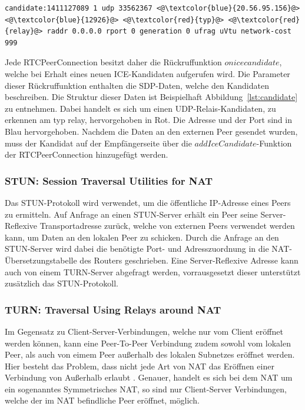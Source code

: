 \vspace{1pc}
\lstset{style=STYLE_ICE_CANDIDATE_0}
\begin{lstlisting}[caption={SDP-Datenstring eines Relais-ICE-Kandidaten},captionpos=b,label={lst:candidate}]
candidate:1411127089 1 udp 33562367 <@\textcolor{blue}{20.56.95.156}@> <@\textcolor{blue}{12926}@> <@\textcolor{red}{typ}@> <@\textcolor{red}{relay}@> raddr 0.0.0.0 rport 0 generation 0 ufrag uVtu network-cost 999
\end{lstlisting}

Jede RTCPeerConnection besitzt daher die Rückruffunktion \glqq{}$onicecandidate$\grqq{}, welche bei Erhalt eines neuen \acs{ICE}-Kandidaten aufgerufen wird. Die Parameter dieser Rückruffunktion enthalten die \acs{SDP}-Daten, welche den Kandidaten beschreiben. Die Struktur dieser Daten ist Beispielhaft Abbildung~\ref{lst:candidate} zu entnehmen. Dabei handelt es sich um einen \acs{UDP}-Relais-Kandidaten, zu erkennen am \glqq{}typ relay\grqq{}, hervorgehoben in Rot. Die Adresse und der Port sind in Blau hervorgehoben. Nachdem die Daten an den externen Peer gesendet wurden, muss der Kandidat auf der Empfängerseite über die $addIceCandidate$-Funktion der RTCPeerConnection hinzugefügt werden.

\subsubsection{STUN: Session Traversal Utilities for NAT}
Das \acf{STUN}-Protokoll wird verwendet, um die öffentliche \acs{IP}-Adresse eines Peers zu ermitteln. Auf Anfrage an einen STUN-Server erhält ein Peer seine Server-Reflexive Transportadresse zurück, welche von externen Peers verwendet werden kann, um Daten an den lokalen Peer zu schicken. Durch die Anfrage an den \acs{STUN}-Server wird dabei die benötigte Port- und Adresszuordnung in die \acs{NAT}-Übersetzungstabelle des Routers geschrieben. Eine Server-Reflexive Adresse kann auch von einem TURN-Server abgefragt werden, vorrausgesetzt dieser unterstützt zusätzlich das \acs{STUN}-Protokoll.\par

\subsubsection{TURN: Traversal Using Relays around NAT}
Im Gegensatz zu Client-Server-Verbindungen, welche nur vom Client eröffnet werden können, kann eine Peer-To-Peer Verbindung zudem sowohl vom lokalen Peer, als auch von eimem Peer außerhalb des lokalen Subnetzes eröffnet werden. Hier besteht das Problem, dass nicht jede Art von \acs{NAT} das Eröffnen einer Verbindung von Außerhalb erlaubt \cite{natproblemsRFC}. Genauer, handelt es sich bei dem \acs{NAT} um ein sogenanntes \glqq{}Symmetrisches \acs{NAT}\grqq{}, so sind nur Client-Server Verbindungen, welche der im \acs{NAT} befindliche Peer eröffnet, möglich.\par

